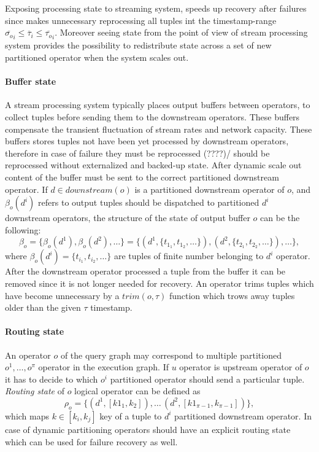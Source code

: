 Exposing processing state to streaming system, speeds up recovery after failures since makes unnecessary reprocessing  all tuples int the timestamp-range $\overline{\sigma_o}_i \leq \overline{\tau}_i \leq \overline{\tau_o}_i$. Moreover seeing state from the point of view of stream processing system provides the possibility to redistribute state across a set of new partitioned operator when the system scales out.
\paragraph{Buffer state}
A stream processing system typically places output buffers between operators, to collect tuples before sending them to the downstream operators. These buffers compensate the transient fluctuation of stream rates and network capacity. These buffers stores tuples not have been yet processed by downstream operators, therefore in case of  failure they must be reprocessed (????)/ should be reprocessed without externalized and backed-up state.
After dynamic scale out content of the buffer must be sent to the correct partitioned downstream operator.  If $d \in downstream(o)$ is a partitioned downstream operator of $o$, and  $\beta_o(d^i)$ refers to output tuples should be dispatched to  partitioned $d^i$ downstream operators, the structure of the state of output buffer $o$ can be the following:
\begin{equation}
\beta_o=\{\beta_o(d^1),\beta_o(d^2),\dots\}=\{(d^1,\{t_{1_1},t_{1_2},\dots\}),(d^2,\{t_{2_1},t_{2_2},\dots\}),\dots\}, 
\end{equation}
where $\beta_o(d^i) = \{t_{i_1},t_{i_2},\dots\}$ are  tuples of finite number belonging to $d^i$ operator. After the downstream operator processed a tuple from the buffer it can be removed since it is not longer needed for recovery. An operator trims tuples which have become unnecessary by a $trim(o,\tau)$ function which trows away tuples older than the given $\tau$ timestamp.

\paragraph{Routing state}
An operator $o$ of the query graph may correspond to multiple partitioned $o^1,\dots,o^{\pi}$ operator in the execution graph. If $u$ operator is upstream operator of $o$ it has to decide to which $o^i$ partitioned operator should send a particular tuple. \textit{Routing state} of $o$ logical operator can be defined  as
\begin{equation}
\rho_o=\{(d^1,[k1_1,k_2]),\dots\,(d^2,[k1_{\pi-1},k_{\pi-1}])\}, 
\end{equation} 
which maps $k \in [k_i,k_j]$ key of a tuple to $d^i$ partitioned downstream operator. 
In case of dynamic partitioning operators should have an explicit  routing state which can be used for failure recovery as well.

